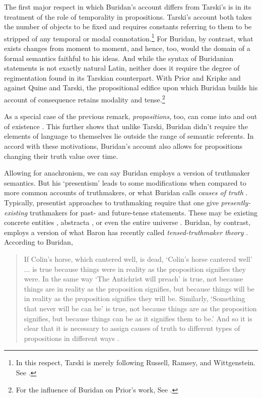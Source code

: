 \documentclass[]{article}
\begin{document}
The first major respect in which Buridan's account differs from Tarski's is in its treatment of the role of temporality in propositions. Tarski's account both takes the number of objects to be fixed and requires constants referring to them to be stripped of any temporal or modal connotation.\footnote{In this respect, Tarski is merely following Russell, Ramsey, and Wittgenstein. See \cite[59ff]{Ramsey1931}.} For Buridan, by contrast, what exists changes from moment to moment, and hence, too, would the domain of a formal semantics faithful to his ideas. And while the syntax of Buridanian statements is not exactly natural Latin, neither does it require the degree of regimentation found in its Tarskian counterpart. With Prior and Kripke and against Quine and Tarski, the propositional edifice upon which Buridan builds his account of consequence retains modality and tense.\footnote{For the influence of Buridan on Prior's work, See \cite{Uckelman2012b}.}

As a special case of the previous remark, \textit{propositions}, too, can come into and out of existence \cite{Klima2004} \cite{DutilhNovaes2005}. This further shows that unlike Tarski, Buridan didn't require the elements of language to themselves lie outside the range of semantic referents. In accord with these motivations, Buridan's account also allows for propositions changing their truth value over time.

Allowing for anachronism, we can say Buridan employs a version of truthmaker semantics. But his `presentism' leads to some modifications when compared to more common accounts of truthmakers, or what Buridan calls \textit{causes of truth} \cite[TC I.1]{Buridan2015}. Typically, presentist approaches to truthmaking require that one give \textit{presently-existing} truthmakers for past- and future-tense statements. These may be existing concrete entities \cite{Cameron2008} \cite{Cameron2011} \cite{Cameron2013}, abstracta \cite{Crisp2007}, or even the entire universe \cite{Bigelow1996}. Buridan, by contrast, employs a version of what Baron has recently called \textit{tensed-truthmaker theory} \cite{Baron2015}. According to Buridan,
\begin{quote}
If Colin's horse, which cantered well, is dead, `Colin's horse cantered well' ... is true because things were in reality as the proposition signifies they were. In the same way `The Antichrist will preach' is true, not because things are in reality as the proposition signifies, but because things will be in reality as the proposition signifies they will be. Similarly, `Something that never will be can be' is true, not because things are as the proposition signifies, but because things can be as it signifies them to be.' And so it is clear that it is necessary to assign causes of truth to different types of propositions in different ways \cite[TC I. 1, 63]{Buridan2015}.
\end{quote}
\end{document}
